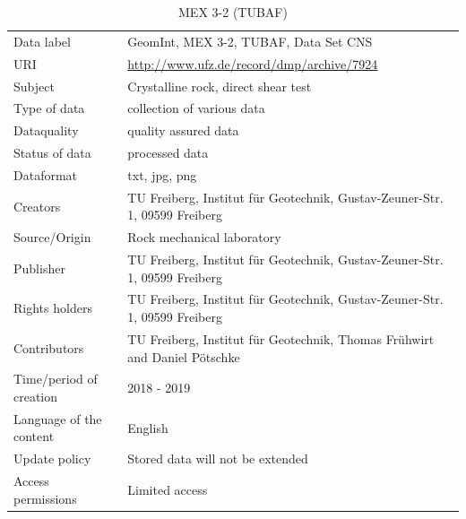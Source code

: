 \begin{table}[!ht]
\caption{MEX 3-2 (TUBAF)}
\label{tab:dms-mex3-2}
\small
\begin{tabular}{R{3cm}|L{7cm}}
\hline
%
Data label & GeomInt, MEX 3-2, TUBAF, Data Set CNS \\
URI &  \url{http://www.ufz.de/record/dmp/archive/7924} \\
Subject  & Crystalline rock, direct shear test \\
Type of data  & collection of various data \\
Dataquality  & quality assured data \\
Status of data  & processed data \\
Dataformat  & txt, jpg, png \\
Creators  & TU Freiberg, Institut für Geotechnik, Gustav-Zeuner-Str. 1, 09599 Freiberg \\
Source/Origin  & Rock mechanical laboratory \\
Publisher  & TU Freiberg, Institut für Geotechnik, Gustav-Zeuner-Str. 1, 09599 Freiberg \\
Rights holders  & TU Freiberg, Institut für Geotechnik, Gustav-Zeuner-Str. 1, 09599 Freiberg \\
Contributors  & TU Freiberg, Institut für Geotechnik, Thomas Fr\"uhwirt and Daniel P\"otschke \\
Time/period of creation  & 2018 - 2019 \\
Language of the content & English \\
Update policy  & Stored data will not be extended \\
Access permissions  & Limited access \\
%
\hline
\end{tabular}
\end{table}